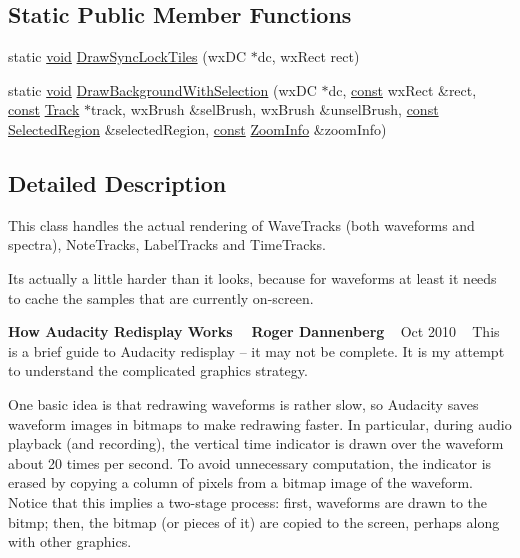 \subsection*{Static Public Member Functions}
\begin{DoxyCompactItemize}
\item 
static \hyperlink{sound_8c_ae35f5844602719cf66324f4de2a658b3}{void} \hyperlink{class_track_artist_ac1ed1e63b3e8682855f002a6696324bd}{Draw\+Sync\+Lock\+Tiles} (wx\+DC $\ast$dc, wx\+Rect rect)
\item 
static \hyperlink{sound_8c_ae35f5844602719cf66324f4de2a658b3}{void} \hyperlink{class_track_artist_aa39e383c6894d3a72cd1783399288a19}{Draw\+Background\+With\+Selection} (wx\+DC $\ast$dc, \hyperlink{getopt1_8c_a2c212835823e3c54a8ab6d95c652660e}{const} wx\+Rect \&rect, \hyperlink{getopt1_8c_a2c212835823e3c54a8ab6d95c652660e}{const} \hyperlink{class_track}{Track} $\ast$track, wx\+Brush \&sel\+Brush, wx\+Brush \&unsel\+Brush, \hyperlink{getopt1_8c_a2c212835823e3c54a8ab6d95c652660e}{const} \hyperlink{class_selected_region}{Selected\+Region} \&selected\+Region, \hyperlink{getopt1_8c_a2c212835823e3c54a8ab6d95c652660e}{const} \hyperlink{class_zoom_info}{Zoom\+Info} \&zoom\+Info)
\end{DoxyCompactItemize}


\subsection{Detailed Description}
This class handles the actual rendering of Wave\+Tracks (both waveforms and spectra), Note\+Tracks, Label\+Tracks and Time\+Tracks. 

It\textquotesingle{}s actually a little harder than it looks, because for waveforms at least it needs to cache the samples that are currently on-\/screen.

{\bfseries How Audacity Redisplay Works ~\newline
 Roger Dannenberg} ~\newline
Oct 2010 ~\newline
 This is a brief guide to Audacity redisplay -- it may not be complete. It is my attempt to understand the complicated graphics strategy.

One basic idea is that redrawing waveforms is rather slow, so Audacity saves waveform images in bitmaps to make redrawing faster. In particular, during audio playback (and recording), the vertical time indicator is drawn over the waveform about 20 times per second. To avoid unnecessary computation, the indicator is erased by copying a column of pixels from a bitmap image of the waveform. Notice that this implies a two-\/stage process\+: first, waveforms are drawn to the bitmp; then, the bitmap (or pieces of it) are copied to the screen, perhaps along with other graphics.


